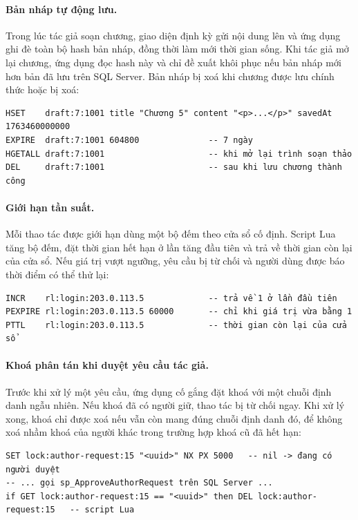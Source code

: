 \paragraph{Bản nháp tự động lưu.} Trong lúc tác giả soạn chương, giao diện định kỳ gửi nội dung lên và ứng dụng ghi đè toàn bộ hash bản nháp, đồng thời làm mới thời gian sống. Khi tác giả mở lại chương, ứng dụng đọc hash này và chỉ đề xuất khôi phục nếu bản nháp mới hơn bản đã lưu trên SQL Server. Bản nháp bị xoá khi chương được lưu chính thức hoặc bị xoá:

\begin{verbatim}
HSET    draft:7:1001 title "Chương 5" content "<p>...</p>" savedAt 1763460000000
EXPIRE  draft:7:1001 604800              -- 7 ngày
HGETALL draft:7:1001                     -- khi mở lại trình soạn thảo
DEL     draft:7:1001                     -- sau khi lưu chương thành công
\end{verbatim}

\paragraph{Giới hạn tần suất.} Mỗi thao tác được giới hạn dùng một bộ đếm theo cửa sổ cố định. Script Lua tăng bộ đếm, đặt thời gian hết hạn ở lần tăng đầu tiên và trả về thời gian còn lại của cửa sổ. Nếu giá trị vượt ngưỡng, yêu cầu bị từ chối và người dùng được báo thời điểm có thể thử lại:

\begin{verbatim}
INCR    rl:login:203.0.113.5             -- trả về 1 ở lần đầu tiên
PEXPIRE rl:login:203.0.113.5 60000       -- chỉ khi giá trị vừa bằng 1
PTTL    rl:login:203.0.113.5             -- thời gian còn lại của cửa sổ
\end{verbatim}

\paragraph{Khoá phân tán khi duyệt yêu cầu tác giả.} Trước khi xử lý một yêu cầu, ứng dụng cố gắng đặt khoá với một chuỗi định danh ngẫu nhiên. Nếu khoá đã có người giữ, thao tác bị từ chối ngay. Khi xử lý xong, khoá chỉ được xoá nếu vẫn còn mang đúng chuỗi định danh đó, để không xoá nhầm khoá của người khác trong trường hợp khoá cũ đã hết hạn:

\begin{verbatim}
SET lock:author-request:15 "<uuid>" NX PX 5000   -- nil -> đang có người duyệt
-- ... gọi sp_ApproveAuthorRequest trên SQL Server ...
if GET lock:author-request:15 == "<uuid>" then DEL lock:author-request:15   -- script Lua
\end{verbatim}
